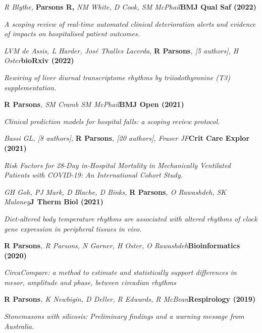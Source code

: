 \item
	\textit{R Blythe, }\textbf{Parsons R, }\textit{NM White, D Cook, SM McPhail}\textbf{\hfill{BMJ Qual Saf (2022)}}\par
	\textit{A scoping review of real-time automated clinical deterioration alerts and evidence of impacts on hospitalised patient outcomes.}
\item
	\textit{LVM de Assis, L Harder, José Thalles Lacerda, }\textbf{R Parsons}\textit{, [5 authors], H Oster}\textbf{\hfill bioRxiv (2022)}\par 
    \textit{Rewiring of liver diurnal transcriptome rhythms by triiodothyronine (T3) supplementation.}
\item
    \textbf{R Parsons}\textit{, SM Cramb SM McPhail}\textbf{\hfill BMJ Open (2021)}\par 
    \textit{Clinical prediction models for hospital falls: a scoping review protocol.}
\item
    \textit{Bassi GL, [8 authors], }\textbf{R Parsons}\textit{, [20 authors], Fraser JF}\textbf{\hfill Crit Care Explor (2021)}\par 
    \textit{Risk Factors for 28-Day in-Hospital Mortality in Mechanically Ventilated Patients with COVID-19: An International Cohort Study.}
\item
    \textit{GH Goh, PJ Mark, D Blache, D Binks, }\textbf{R Parsons}\textit{, O Rawashdeh, SK Maloney}\textbf{\hfill J Therm Biol (2021)}\par 
    \textit{Diet-altered body temperature rhythms are associated with altered rhythms of clock gene expression in peripheral tissues in vivo.}
\item
    \textbf{R Parsons}\textit{, R Parsons, N Garner, H Oster, O Rawashdeh}\textbf{\hfill Bioinformatics (2020)}\par 
    \textit{CircaCompare: a method to estimate and statistically support differences in mesor, amplitude and phase, between circadian rhythms}
\item
    \textbf{R Parsons}\textit{, K Newbigin, D Deller, R Edwards, R McBean}\textbf{\hfill Respirology (2019)}\par 
    \textit{Stonemasons with silicosis: Preliminary findings and a warning message from Australia.}
